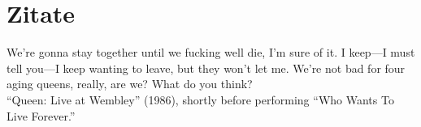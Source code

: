\chapter{Zitate}
\label{appendix:zitate}

We’re gonna stay together until we fucking well die, I’m sure of it. I keep—I must tell you—I keep wanting to leave, but they won’t let me. We’re not bad for four aging queens, really, are we? What do you think? \\
\enquote{Queen: Live at Wembley} (1986), shortly before performing \enquote{Who Wants To Live Forever.}
